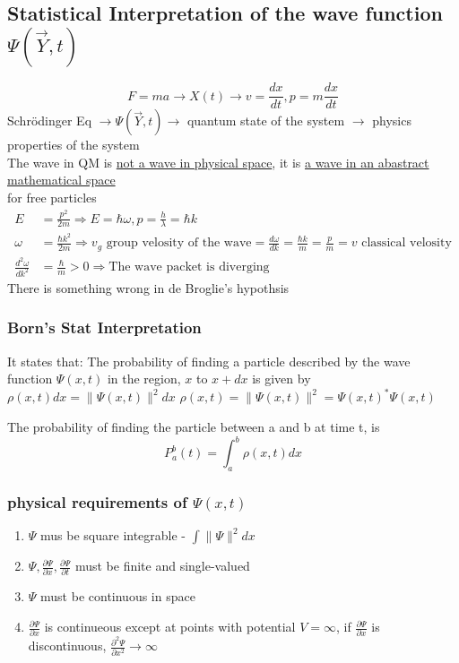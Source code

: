 \documentclass[12pt, a4paper]{article}
\begin{document}
\subsection{Statistical Interpretation of the wave function $\Psi(\vec{Y},t)$}
$$F=ma\rightarrow X(t) \rightarrow v=\frac{dx}{dt},p=m\frac{dx}{dt}$$
Schr\"odinger Eq $\rightarrow \Psi(\vec{Y},t)\rightarrow$ quantum state of the system $\rightarrow$ physics properties of the system \\
The wave in QM is \underline{not a wave in physical space}, it is \underline{a wave in an abastract mathematical space}\\
for free particles
\begin{align*}
E&=\frac{p^2}{2m}\Rightarrow E=\hbar \omega, p=\frac{h}{\lambda}=\hbar k\\
\omega &= \frac{\hbar k^2}{2m} \Rightarrow v_g \text{ group velosity of the wave} = \frac{d\omega}{dk}=\frac{\hbar k}{m}=\frac{p}{m}=v \text{ classical velosity}\\
\frac{d^2\omega}{dk^2}&=\frac{\hbar}{m} > 0 \Rightarrow \text{The wave packet is diverging}
\end{align*}
There is something wrong in de Broglie's hypothsis
\subsubsection{Born's Stat Interpretation}
It states that: The probability of finding a particle described by the wave function $\Psi (x,t)$ in the region, $x$ to $x+dx$ is given by $\rho(x,t)dx = \| \Psi(x,t) \|^2 dx$
$\rho(x,t)=\| \Psi(x,t) \|^2 = \Psi(x,t)^*\Psi(x,t)$

The probability of finding the particle between a and b at time t, is $$P_a^b(t)=\int_a^b\rho(x,t)dx$$

\subsubsection{physical requirements of $\Psi(x,t)$}
\begin{enumerate}
\item $\Psi$ mus be square integrable - $\int \|\Psi\|^2dx$
\item $\Psi, \frac{\partial \Psi}{\partial x}, \frac{\partial \Psi}{\partial t}$ must be finite and single-valued
\item $\Psi$ must be continuous in space
\item $\frac{\partial \Psi}{\partial x}$ is continueous except at points with potential $V=\infty$, if $\frac{\partial \Psi}{\partial x}$ is discontinuous, $\frac{\partial^2 \Psi}{\partial x^2}\rightarrow \infty$
\end{enumerate}
\end{document}
